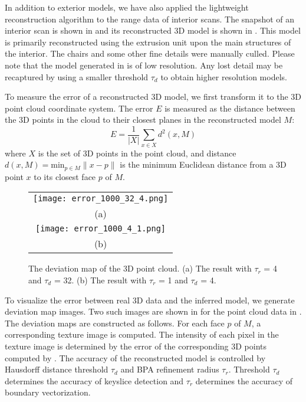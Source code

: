 In addition to exterior models, we have also applied the lightweight
reconstruction algorithm to the range data of interior scans.
The snapshot of an interior scan is shown in 
and its reconstructed 3D model is shown in .
This model is primarily reconstructed using the extrusion unit
upon the main structures of the interior.
The chairs and some other fine details were manually culled.
Please note that the model generated in  is of low resolution.
Any lost detail may be recaptured by using a smaller threshold $\tau_d$
to obtain higher resolution models.

To measure the error of a reconstructed 3D model, we first transform it
to the 3D point cloud coordinate system.
The error $E$ is measured as the distance between the 3D points in the cloud
to their closest planes in the reconstructed model $M$:
\begin{equation}
E = \frac{1}{|X|}\sum_{x\in{X}}{d^2(x, M)}
\label{eq:em}
\end{equation}
where $X$ is the set of 3D points in the point cloud, and distance
$d(x, M) = \text{min}_{p \in M}\lVert x - p \lVert$ is the minimum
Euclidean distance from a 3D point $x$ to its closest face $p$ of $M$.

\begin{figure} [htbp]
\begin{center}
\begin{tabular}{c}
\texttt{[image: error\_1000\_32\_4.png]} \\
(a) \\
\texttt{[image: error\_1000\_4\_1.png]} \\
(b)
\end{tabular}
\end{center}
\caption{The deviation map of the 3D point cloud. (a) The result with $\tau_r$ = 4 and $\tau_d$ = 32.
(b) The result with $\tau_r$ = 1 and $\tau_d$ = 4. }
\label{fig:EM}
\end{figure}

To visualize the error between real 3D data and the inferred model,
we generate deviation map images.
Two such images are shown in  for the point cloud data in
.
The deviation maps are constructed as follows.
For each face $p$ of $M$, a corresponding texture image is computed.
The intensity of each pixel in the texture image is determined by the error
of the corresponding 3D points computed by .
The accuracy of the reconstructed model is controlled by Hausdorff distance
threshold $\tau_d$ and BPA refinement radius $\tau_r$.
Threshold $\tau_d$ determines the accuracy of keyslice detection and $\tau_r$
determines the accuracy of boundary vectorization.

